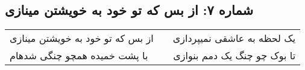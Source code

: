 \begin{center}
\section*{شماره ۷: از بس که تو خود به خویشتن مینازی}
\label{sec:007}
\begin{longtable}{l p{0.5cm} r}
از بس که تو خود به خویشتن مینازی
&&
یک لحظه به عاشقی نمیپردازی
\\
با پشت خمیده همچو چنگی شدهام
&&
تا بوک چو چنگ یک دمم بنوازی
\\
\end{longtable}
\end{center}

